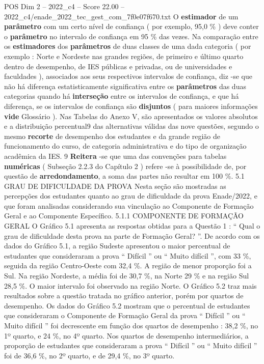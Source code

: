 \begin{textsample}{POS Dim 2 – 2022\_c4 – Score 22.00 – 2022\_c4/enade\_2022\_tec\_gest\_com\_7f0e07f670.txt}
O \textbf{estimador} de um \textbf{parâmetro} com um certo nível de confiança ( por exemplo, 95,0 \% ) deve conter o \textbf{parâmetro} no intervalo de confiança em 95 \% das vezes.
Na comparação entre os \textbf{estimadores} dos \textbf{parâmetros} de duas classes de uma dada categoria ( por exemplo : Norte e Nordeste nas grandes regiões, de primeiro e último quarto dentro de desempenho, de IES públicas e privadas, ou de universidades e faculdades ), associados aos seus respectivos intervalos de confiança, diz -se que não há diferença estatisticamente significativa entre os \textbf{parâmetros} das duas categorias quando há \textbf{interseção} entre os intervalos de confiança, e que há diferença, se os intervalos de confiança são \textbf{disjuntos} ( para maiores informações \textbf{vide} Glossário ).
Nas Tabelas do Anexo V, são apresentados os valores absolutos e a distribuição percentual9 das alternativas válidas das nove questões, segundo o mesmo \textbf{recorte} de desempenho dos estudantes e da grande região de funcionamento do curso, de categoria administrativa e do tipo de organização acadêmica da IES. 9 \textbf{Reitera} -se que uma das convenções para tabelas \textbf{numéricas} ( Subseção 2.2.3 do Capítulo 2 ) refere -se à possibilidade de, por questão de \textbf{arredondamento}, a soma das partes não resultar em 100 \%. 5.1 GRAU DE DIFICULDADE DA PROVA Nesta seção são mostradas as percepções dos estudantes quanto ao grau de dificuldade da prova Enade/2022, e que foram analisadas considerando sua vinculação ao Componente de Formação Geral e ao Componente Específico. 5.1.1 COMPONENTE DE FORMAÇÃO GERAL O Gráfico 5.1 apresenta as respostas obtidas para a Questão 1 : “ Qual o grau de dificuldade desta prova na parte de Formação Geral? ”.
De acordo com os dados do Gráfico 5.1, a região Sudeste apresentou o maior percentual de estudantes que consideraram a prova “ Difícil ” ou “ Muito difícil ”, com 33 \%, seguida da região Centro-Oeste com 32,4 \%.
A região de menor proporção foi a Sul.
Na região Nordeste, a média foi de 30,7 \%, na Norte 29 \% e na região Sul 28,5 \%.
O maior intervalo foi observado na região Norte.
O Gráfico 5.2 traz mais resultados sobre a questão tratada no gráfico anterior, porém por quartos de desempenho.
Os dados do Gráfico 5.2 mostram que o percentual de estudantes que consideraram o Componente de Formação Geral da prova “ Difícil ” ou “ Muito difícil ” foi decrescente em função dos quartos de desempenho : 38,2 \%, no 1º quarto, e 24 \%, no 4º quarto.
Nos quartos de desempenho intermediários, a proporção de estudantes que consideraram a prova “ Difícil ” ou “ Muito difícil ” foi de 36,6 \%, no 2º quarto, e de 29,4 \%, no 3º quarto.

\end{textsample}
